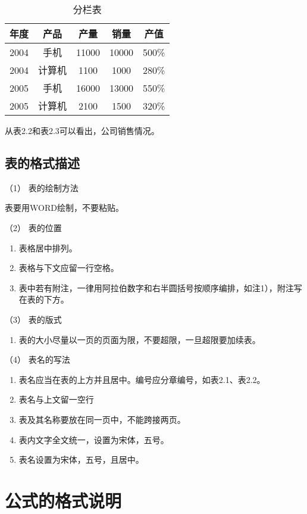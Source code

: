 \begin{table}
	\centering
	\song\wuhao
	\caption{ 分栏表}
	\begin{tabular}{ccccc}
	\hline
	年度&产品&产量&销量&产值\\
	\hline
	2004&手机&11000&10000&500\%\\
	2004&计算机&1100&1000&280\%\\
	\hline
	2005&手机&16000&13000&550\%\\
	2005&计算机&2100&1500&320\%\\
	\hline
	\end{tabular}
\end{table}

从表2.2和表2.3可以看出，公司销售情况。

\subsection{表的格式描述}
（1） 表的绘制方法

表要用WORD绘制，不要粘贴。

（2） 表的位置
\begin{enumerate}[label=\circled{\arabic*}]
\item 表格居中排列。
\item 表格与下文应留一行空格。
\item 表中若有附注，一律用阿拉伯数字和右半圆括号按顺序编排，如注1），附注写在表的下方。
\end{enumerate}

（3） 表的版式
\begin{enumerate}[label=\circled{\arabic*}]
\item 表的大小尽量以一页的页面为限，不要超限，一旦超限要加续表。
\end{enumerate}

（4） 表名的写法
\begin{enumerate}[label=\circled{\arabic*}]
\item 表名应当在表的上方并且居中。编号应分章编号，如表2.1、表2.2。
\item 表名与上文留一空行
\item 表及其名称要放在同一页中，不能跨接两页。
\item 表内文字全文统一，设置为宋体，五号。
\item 表名设置为宋体，五号，且居中。
\end{enumerate}

\section{公式的格式说明}
